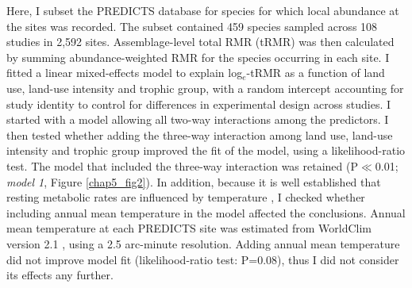 Here, I subset the PREDICTS database for species for which local abundance at the sites was recorded. The subset contained 459 species sampled across 108 studies in 2,592 sites.
Assemblage-level total RMR (tRMR) was then calculated by summing abundance-weighted RMR for the species occurring in each site. I fitted a linear mixed-effects model to explain log$_e$-tRMR as a function of land use, land-use intensity and trophic group, with a random intercept accounting for study identity to control for differences in experimental design across studies. I started with a model allowing all two-way interactions among the predictors. I then tested whether adding the three-way interaction among land use, land-use intensity and trophic group improved the fit of the model, using a likelihood-ratio test. The model that included the three-way interaction was retained (P$\ll$0.01; \textit{model 1}, Figure \ref{chap5_fig2}). In addition, because it is well established that resting metabolic rates are influenced by temperature \citep{Clarke2004a}, I checked whether including annual mean temperature in the model affected the conclusions. Annual mean temperature at each PREDICTS site was estimated from WorldClim version 2.1 \citep{Fick2017}, using a 2.5 arc-minute resolution. Adding annual mean temperature did not improve model fit (likelihood-ratio test: P=0.08), thus I did not consider its effects any further.   

